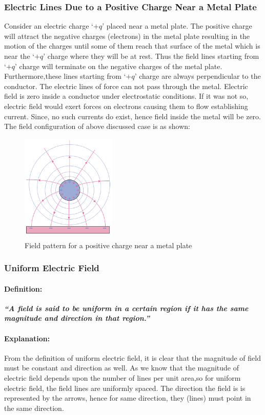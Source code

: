 \subsubsection{Electric Lines Due to a Positive Charge Near a Metal Plate}
Consider an electric charge `$+q$' placed near a metal plate.
The positive charge will attract the negative charges (electrons) in
the metal plate resulting in the motion of the charges until some
of them reach that surface of the metal which is near the `$+q$'
charge where they will be at rest. Thus the field lines starting from
`$+q$' charge will terminate on the negative charges of the metal plate.
Furthermore,these lines starting from `$+q$' charge are always perpendicular
to the conductor. The electric lines of force can not pass through the metal.
Electric field is zero inside a conductor under electrostatic conditions.
If it was not so, electric field would exert forces on electrons
causing them to flow establishing current. Since, no such currents do exist,
hence field inside the metal will be zero.
The field configuration of above discussed case is as shown:

\begin{figure}[H]
  \centering
  \includegraphics[width=0.4\textwidth]{Images/Chapter-11/11.7.png}
  \caption{Field pattern for a positive charge near a metal plate}
  \label{fig:11.7}
\end{figure}

\subsubsection{Uniform Electric Field}
\paragraph{Definition:}
\textit{\textbf{“A field is said to be uniform in a certain region 
if it has the same magnitude and direction in that region.”}}
\paragraph{Explanation:}
From the definition of uniform electric field, it is clear
that the magnitude of field must be constant and direction as well.
As we know that the magnitude of electric field depends upon the number
of lines per unit area,so for uniform electric field, the field lines
are uniformly spaced. The direction the field is is represented by the
arrows, hence for same direction,
they (lines) must point in the same direction.
